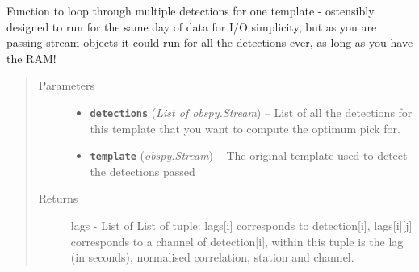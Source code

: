 \documentclass[a4paper,10pt,english]{sphinxmanual}
\begin{document}
\begin{fulllineitems}
\label{core:lag_calc.day_loop}
Function to loop through multiple detections for one template - ostensibly
designed to run for the same day of data for I/O simplicity, but as you
are passing stream objects it could run for all the detections ever, as long
as you have the RAM!
\begin{quote}\begin{description}
\item[{Parameters}] \leavevmode\begin{itemize}
\item {} 
\textbf{\texttt{detections}} (\emph{List of obspy.Stream}) -- List of all the detections for this template that you
want to compute the optimum pick for.

\item {} 
\textbf{\texttt{template}} (\emph{obspy.Stream}) -- The original template used to detect the detections passed

\end{itemize}

\item[{Returns}] \leavevmode
lags - List of List of tuple: lags{[}i{]} corresponds to detection{[}i{]},
lags{[}i{]}{[}j{]} corresponds to a channel of detection{[}i{]}, within
this tuple is the lag (in seconds), normalised correlation,
station and channel.

\end{description}\end{quote}

\end{fulllineitems}

\end{document}
